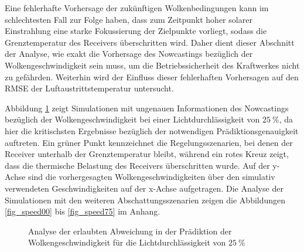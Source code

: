 Eine fehlerhafte Vorhersage der zukünftigen Wolkenbedingungen kann im schlechtesten Fall zur Folge haben, dass zum Zeitpunkt hoher solarer Einstrahlung eine starke Fokussierung der Zielpunkte vorliegt, sodass die Grenztemperatur des Receivers überschritten wird.
Daher dient dieser Abschnitt der Analyse, wie exakt die Vorhersage des Nowcastings bezüglich der Wolkengeschwindigkeit sein muss, um die Betriebssicherheit des Kraftwerkes nicht zu gefährden.
Weiterhin wird der Einfluss dieser fehlerhaften Vorhersagen auf den RMSE der Luftaustrittstemperatur untersucht.

Abbildung \ref{fig_speed25} zeigt Simulationen mit ungenauen Informationen des Nowcastings bezüglich der Wolkengeschwindigkeit bei einer Lichtdurchlässigkeit von $\SI{25}{\percent}$, da hier die kritischsten Ergebnisse bezüglich der notwendigen Prädiktionsgenauigkeit auftreten.
Ein grüner Punkt kennzeichnet die Regelungsszenarien, bei denen der Receiver unterhalb der Grenztemperatur bleibt, während ein rotes Kreuz zeigt, dass die thermische Belastung des Receivers überschritten wurde.
Auf der y-Achse sind die vorhergesagten Wolkengeschwindigkeiten über den simulativ verwendeten Geschwindigkeiten auf der x-Achse aufgetragen.
Die Analyse der Simulationen mit den weiteren Abschattungsszenarien zeigen die Abbildungen \ref{fig_speed00} bis \ref{fig_speed75} im Anhang.

\begin{figure}[h!]
    \centering
    \setlength{\fboxsep}{1pt}
    \setlength{\fboxrule}{1pt}
    \caption[Analyse der erlaubten Abweichung in der Prädiktion der Wolkengeschwindigkeit für die Lichtdurchlässigkeit von $\SI{25}{\percent}$]{Analyse der erlaubten Abweichung in der Prädiktion der Wolkengeschwindigkeit für die Lichtdurchlässigkeit von $\SI{25}{\percent}$}
    \label{fig_speed25}
\end{figure}

